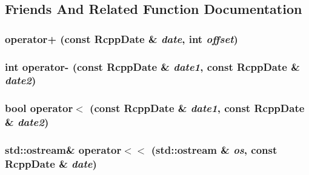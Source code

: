 \subsection{Friends And Related Function Documentation}
\hypertarget{classRcppDate_add881a27c2b8e36897a59bca1d04585f}{
\subsubsection[{operator+}]{ operator+ (const {\bf RcppDate} \& {\em date}, \/  int {\em offset})}}
\label{classRcppDate_add881a27c2b8e36897a59bca1d04585f}
\hypertarget{classRcppDate_a49241820910c75948937f70f76c0849d}{
\subsubsection[{operator-\/}]{\setlength{\rightskip}{0pt plus 5cm}int operator-\/ (const {\bf RcppDate} \& {\em date1}, \/  const {\bf RcppDate} \& {\em date2})}}
\label{classRcppDate_a49241820910c75948937f70f76c0849d}
\hypertarget{classRcppDate_af852d3a1ad52776201f385be5ea18c71}{
\subsubsection[{operator$<$}]{\setlength{\rightskip}{0pt plus 5cm}bool operator$<$ (const {\bf RcppDate} \& {\em date1}, \/  const {\bf RcppDate} \& {\em date2})}}
\label{classRcppDate_af852d3a1ad52776201f385be5ea18c71}
\hypertarget{classRcppDate_a62c075d47528a48e5fb57c1855c4d71c}{
\subsubsection[{operator$<$$<$}]{\setlength{\rightskip}{0pt plus 5cm}std::ostream\& operator$<$$<$ (std::ostream \& {\em os}, \/  const {\bf RcppDate} \& {\em date})}}
